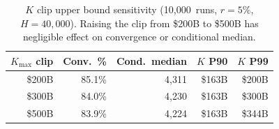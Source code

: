 \begin{table}[htbp]
\centering
\caption{$K$ clip upper bound sensitivity (10{,}000~runs, $r = 5\%$, $H = 40{,}000$). Raising the clip from \$200B to \$500B has negligible effect on convergence or conditional median.}
\label{tab:k_clip}
\small
\begin{tabular}{@{}rrrrr@{}}
\toprule
$K_{\max}$ clip & Conv.\ \% & Cond.\ median & $K$ P90 & $K$ P99 \\
\midrule
\$200B & 85.1\% & 4{,}311 & \$163B & \$200B \\
\$300B & 84.0\% & 4{,}230 & \$163B & \$300B \\
\$500B & 83.9\% & 4{,}224 & \$163B & \$344B \\
\bottomrule
\end{tabular}
\end{table}
